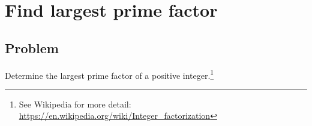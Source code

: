
\section{Find largest prime factor}



\subsection*{Problem}

Determine the largest prime factor of a positive integer.\footnote{
  See Wikipedia for more detail:
  \url{https://en.wikipedia.org/wiki/Integer_factorization}
}
